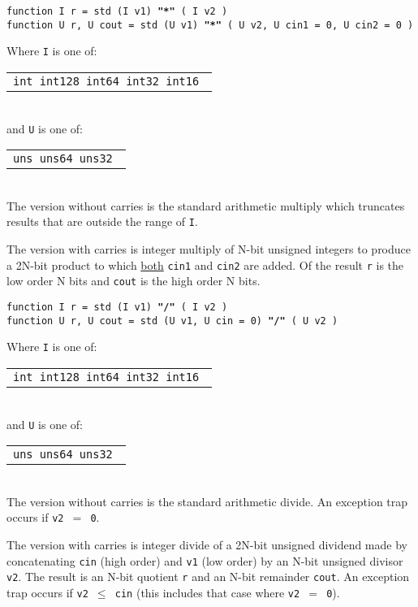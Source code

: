\documentclass[12pt]{article}
\newcommand{\ttkey}[1]{{\tt \bfseries #1}}
\newenvironment{indpar}[1][0.3in]%
	{\begin{list}{}%
		     {\setlength{\itemsep}{0in}%
		      \setlength{\topsep}{0in}%
		      \setlength{\parsep}{1ex}%
		      \setlength{\labelwidth}{#1}%
		      \setlength{\leftmargin}{#1}%
		      \addtolength{\leftmargin}{\labelsep}}%
	 \item}%
	{\end{list}}
\begin{document}
{\tt function I r = std (I v1) \ttkey{"*"} ( I v2 )} \\
{\tt function U r, U cout =
    std (U v1) \ttkey{"*"} ( U v2, U cin1 = 0, U cin2 = 0 )}
\begin{indpar}
Where {\tt I} is one of:
	\begin{tabular}[t]{l}
	\tt int  int128 int64  int32  int16 \\
	\end{tabular}
\\[1ex]
and {\tt U} is one of:
	\begin{tabular}[t]{l}
	\tt uns  uns64  uns32 \\
	\end{tabular}
\\[1ex]
The version without carries is the standard arithmetic multiply
which truncates results that are outside the range of {\tt I}.

The version with carries is integer multiply of N-bit unsigned
integers to produce a 2N-bit product to which \underline{both}
{\tt cin1} and {\tt cin2} are
added.  Of the result {\tt r} is the low order N bits
and {\tt cout} is the high order N bits.

\end{indpar}

{\tt function I r = std (I v1) \ttkey{"/"} ( I v2 )} \\
{\tt function U r, U cout = std (U v1, U cin = 0) \ttkey{"/"} ( U v2 )}
\begin{indpar}
Where {\tt I} is one of:
	\begin{tabular}[t]{l}
	\tt int  int128 int64  int32  int16 \\
	\end{tabular}
\\[1ex]
and {\tt U} is one of:
	\begin{tabular}[t]{l}
	\tt uns  uns64  uns32 \\
	\end{tabular}
\\[1ex]
The version without carries is the standard arithmetic divide.
An exception trap occurs if {\tt v2 $=$ 0}.

The version with carries is integer divide of a 2N-bit unsigned
dividend made by concatenating {\tt cin} (high order) and
{\tt v1} (low order) by an N-bit unsigned divisor {\tt v2}.  The result
is an N-bit quotient {\tt r} and an N-bit remainder {\tt cout}.
An exception trap occurs if {\tt v2 $\leq$ cin} (this includes
that case where {\tt v2 $=$ 0}).

\end{indpar}
\end{document}
